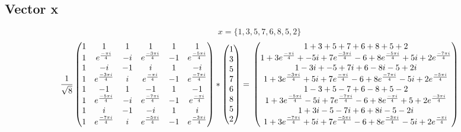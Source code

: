 \documentclass{article}
\begin{document}
\subsection{Vector x}
\[ x = \{1, 3, 5, 7, 6, 8, 5, 2\} \] 
\[ 
  \frac{1}{\sqrt{8}}
	\begin{pmatrix}
		1 & 1                      & 1  & 1                      & 1  & 1             \\
		1 & e^{\frac{- \pi i}{4}}  & -i & e^{\frac{-3 \pi i}{4}} & -1 & e^{\frac{-5 \pi i}{4}}        \\
		1 & -i                     & -1 & i                      & 1  & -i        \\
		1 & e^{\frac{-3 \pi i}{4}} & i  & e^{\frac{- \pi i}{4}}  & -1 & e^{\frac{-7 \pi i}{4}}      \\
		1 & -1                     & 1  & -1                     & 1  & -1         \\
		1 & e^{\frac{-5 \pi i}{4}} & -i & e^{\frac{-7 \pi i}{4}} & -1 & e^{\frac{- \pi i}{4}}         \\
		1 & i                      & -1 & -i                     & 1  & i        \\
		1 & e^{\frac{-7 \pi i}{4}} & i  & e^{\frac{-5 \pi i}{4}} & -1 & e^{\frac{-3 \pi i}{4}}
	\end{pmatrix}
	*
	\begin{pmatrix}
		1 \\
		3 \\
		5 \\
		7 \\
		6 \\
		8 \\
		5 \\
		2 
	\end{pmatrix}
	=  \\
	\begin{pmatrix}
		1      + 3                           + 5                            + 7                           + 6                             + 8                          + 5                            + 2 \\
		1      + 3 e^{\frac{- \pi i}{4}}     + -5i                          + 7e^{\frac{-3 \pi i}{4}} -6  + 8 e^{\frac{-5 \pi i}{4}}      + 5i                         + 2 e^{\frac{-7 \pi i}{4}}  \\
		1 - 3i + -5                          + 7i                           + 6 - 8i - 5                  + 2i \\
		1      + 3e^{\frac{- 3 \pi i}{4}}    + 5i                           + 7 e^{\frac{- \pi i}{4}} -6  + 8 e^{\frac{- 7\pi i}{4}} - 5i + 2e^{\frac{-5 \pi i}{4}} \\
		1 - 3  + 5 - 7                       + 6 -8                         + 5 -2 \\
		1      + 3e^{\frac{-5\pi i}{4}}  -5i + 7 e^{\frac{-7 \pi i}{4}}  -6 + 8 e^{\frac{- \pi i}{4}}     + 5                             + 2 e^{\frac{-3\pi i}{4}} \\
		1      + 3i -5 -7i                   + 6                            + 8i -5 -2i \\
		1      + 3e^{\frac{-7\pi i}{4}}      + 5i                           + 7 e^{\frac{-5\pi i}{4}} - 6 + 8 e^{\frac{-3\pi i}{4}} -5i   + 2 e^{\frac{- \pi i}{4}}
	\end{pmatrix}
\]
\end{document}
